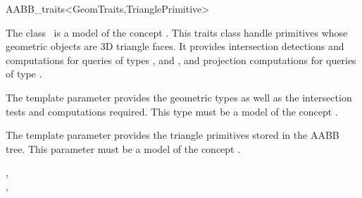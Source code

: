 \ccRefPageBegin


\begin{ccRefClass}{AABB_traits<GeomTraits,TrianglePrimitive>}  %


\ccDefinition
  
The class \ccRefName\ is a model of the concept . This traits class handle primitives whose geometric objects are 3D triangle faces. It provides intersection detections and computations for queries of types ,  and , and projection computations for queries of type .

\ccParameters
The template parameter  provides the geometric types as well as the intersection tests and computations required. This type must be a model of the concept .

The template parameter  provides the triangle primitives stored in the AABB tree. This parameter must be a model of the concept .




\ccTypes


\ccCreation
{}  %




\ccSeeAlso

,\\
, \\

\end{ccRefClass}

\ccRefPageEnd

